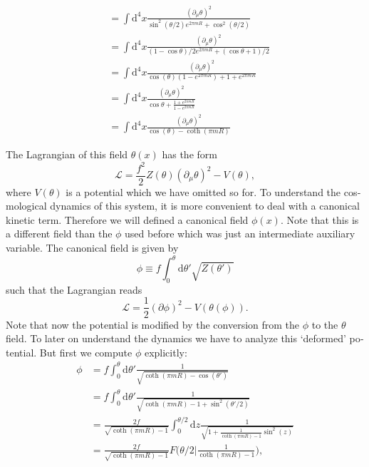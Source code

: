 \documentclass[master,       %
               twoside,        %
               BCOR10mm,       %
               english,ngerman, %
               ]{GAUBM}
\begin{document}
\begin{otherlanguage}{english}
\begin{align}
	 &= \int \mathrm{d}^4 x \frac{(\partial_\mu \theta)^2}{\sin^2(\theta / 2) e^{2\pi m R} + \cos^2(\theta / 2)} \nonumber \\
	 &= \int \mathrm{d}^4 x \frac{(\partial_\mu \theta)^2}{(1 - \cos \theta) / 2 e^{2\pi m R} + (\cos \theta + 1) / 2} \nonumber \\
	 &= \int \mathrm{d}^4 x \frac{(\partial_\mu \theta)^2}{\cos(\theta)(1 - e^{2\pi mR}) + 1 + e^{2\pi mR}} \nonumber \\
	 &= \int \mathrm{d}^4 x \frac{(\partial_\mu \theta)^2}{\cos \theta + \frac{1 + e^{2\pi mR}}{1 - e^{2\pi mR}}} \nonumber \\
	 &= \int \mathrm{d}^4 x \frac{(\partial_\mu \theta)^2}{\cos(\theta) - \coth(\pi mR)}
\end{align}

The Lagrangian of this field $\theta(x)$ has the form
\begin{equation}
	\mathcal{L} = \frac{f^2}{2} Z(\theta) (\partial_\mu \theta)^2 - V(\theta),
\end{equation}
where $V(\theta)$ is a potential which we have omitted so for. 
To understand the cosmological dynamics of this system, it is more convenient to deal with a canonical kinetic term. Therefore we will defined a canonical field $\phi(x)$. Note that this is a different field than the $\phi$ used before which was just an intermediate auxiliary variable.
The canonical field is given by
\begin{equation}
	\phi \equiv f \int_0^\theta \mathrm{d} \theta' \sqrt{Z(\theta')}
\end{equation}
such that the Lagrangian reads
\begin{equation}
	\mathcal{L} = \frac{1}{2} (\partial \phi)^2 - V(\theta(\phi)).
\end{equation}
Note that now the potential is modified by the conversion from the $\phi$ to the $\theta$ field. To later on understand the dynamics we have to analyze this `deformed' potential. 
But first we compute $\phi$ explicitly:
\begin{align}
	\phi &= f \int_0^\theta \mathrm{d} \theta' \frac{1}{\sqrt{\coth(\pi mR) - \cos(\theta')}} \nonumber \\
	&= f \int_0^\theta \mathrm{d} \theta' \frac{1}{\sqrt{\coth(\pi mR) - 1 + \sin^2(\theta'/2)}} \nonumber \\
	&= \frac{2 f}{\sqrt{\coth(\pi mR) - 1}} \int_0^{\theta/2} \mathrm{d} z \frac{1}{\sqrt{1 + \frac{1}{\coth(\pi mR) - 1} \sin^2(z)}} \nonumber \\
	&= \frac{2 f}{\sqrt{\coth(\pi mR) - 1}} F\big(\theta / 2 \big| \frac{1}{\coth(\pi mR) - 1}\big),

\end{align}
\end{otherlanguage}
\end{document}
